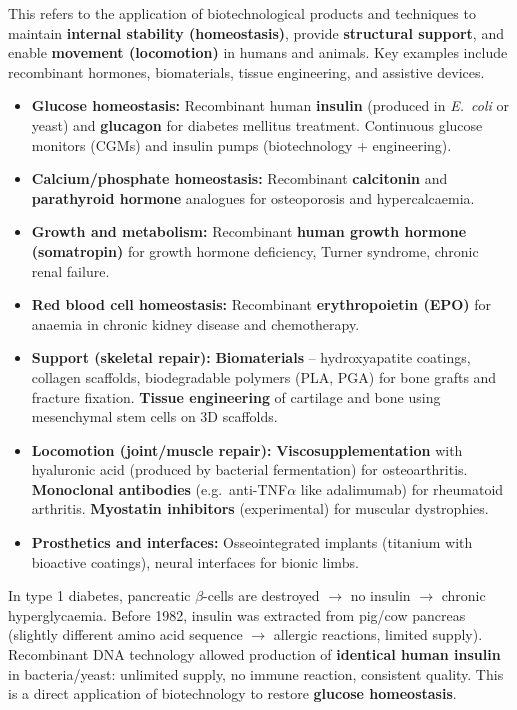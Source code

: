 \documentclass[11pt]{article}
\begin{document}
\begin{definition}
This refers to the application of biotechnological products and techniques to maintain \textbf{internal stability (homeostasis)}, provide \textbf{structural support}, and enable \textbf{movement (locomotion)} in humans and animals. Key examples include recombinant hormones, biomaterials, tissue engineering, and assistive devices.
\end{definition}

\begin{propriete}
\begin{itemize}
\item \textbf{Glucose homeostasis:} Recombinant human \textbf{insulin} (produced in \emph{E.~coli} or yeast) and \textbf{glucagon} for diabetes mellitus treatment. Continuous glucose monitors (CGMs) and insulin pumps (biotechnology + engineering).
\item \textbf{Calcium/phosphate homeostasis:} Recombinant \textbf{calcitonin} and \textbf{parathyroid hormone} analogues for osteoporosis and hypercalcaemia.
\item \textbf{Growth and metabolism:} Recombinant \textbf{human growth hormone (somatropin)} for growth hormone deficiency, Turner syndrome, chronic renal failure.
\item \textbf{Red blood cell homeostasis:} Recombinant \textbf{erythropoietin (EPO)} for anaemia in chronic kidney disease and chemotherapy.
\item \textbf{Support (skeletal repair):} \textbf{Biomaterials} -- hydroxyapatite coatings, collagen scaffolds, biodegradable polymers (PLA, PGA) for bone grafts and fracture fixation. \textbf{Tissue engineering} of cartilage and bone using mesenchymal stem cells on 3D scaffolds.
\item \textbf{Locomotion (joint/muscle repair):} \textbf{Viscosupplementation} with hyaluronic acid (produced by bacterial fermentation) for osteoarthritis. \textbf{Monoclonal antibodies} (e.g.\ anti-TNF$\alpha$ like adalimumab) for rheumatoid arthritis. \textbf{Myostatin inhibitors} (experimental) for muscular dystrophies.
\item \textbf{Prosthetics and interfaces:} Osseointegrated implants (titanium with bioactive coatings), neural interfaces for bionic limbs.
\end{itemize}
\end{propriete}

\begin{exemplebox}
In type 1 diabetes, pancreatic $\beta$-cells are destroyed $\rightarrow$ no insulin $\rightarrow$ chronic hyperglycaemia. Before 1982, insulin was extracted from pig/cow pancreas (slightly different amino acid sequence $\rightarrow$ allergic reactions, limited supply). Recombinant DNA technology allowed production of \textbf{identical human insulin} in bacteria/yeast: unlimited supply, no immune reaction, consistent quality. This is a direct application of biotechnology to restore \textbf{glucose homeostasis}.
\end{exemplebox}
\end{document}
